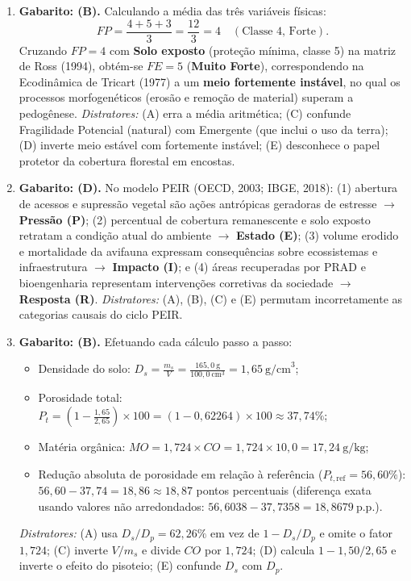\begin{boxGabarito}
\begin{enumerate}[leftmargin=1.8em, itemsep=5pt]
  \item \textbf{Gabarito: (B).} Calculando a média das três variáveis físicas:
  \[
    FP = \frac{4 + 5 + 3}{3} = \frac{12}{3} = 4 \quad (\text{Classe 4, Forte}).
  \]
  Cruzando $FP = 4$ com \textbf{Solo exposto} (proteção mínima, classe 5) na matriz de Ross (1994), obtém-se $FE = 5$ (\textbf{Muito Forte}), correspondendo na Ecodinâmica de Tricart (1977) a um \textbf{meio fortemente instável}, no qual os processos morfogenéticos (erosão e remoção de material) superam a pedogênese. \textit{Distratores:} (A) erra a média aritmética; (C) confunde Fragilidade Potencial (natural) com Emergente (que inclui o uso da terra); (D) inverte meio estável com fortemente instável; (E) desconhece o papel protetor da cobertura florestal em encostas.

  \item \textbf{Gabarito: (D).} No modelo PEIR (OECD, 2003; IBGE, 2018): (1) abertura de acessos e supressão vegetal são ações antrópicas geradoras de estresse $\to$ \textbf{Pressão (P)}; (2) percentual de cobertura remanescente e solo exposto retratam a condição atual do ambiente $\to$ \textbf{Estado (E)}; (3) volume erodido e mortalidade da avifauna expressam consequências sobre ecossistemas e infraestrutura $\to$ \textbf{Impacto (I)}; e (4) áreas recuperadas por PRAD e bioengenharia representam intervenções corretivas da sociedade $\to$ \textbf{Resposta (R)}. \textit{Distratores:} (A), (B), (C) e (E) permutam incorretamente as categorias causais do ciclo PEIR.

  \item \textbf{Gabarito: (B).} Efetuando cada cálculo passo a passo:
  \begin{itemize}[leftmargin=1.4em, itemsep=1pt, topsep=2pt]
    \item Densidade do solo: $D_s = \frac{m_s}{V} = \frac{165,0\ \text{g}}{100,0\ \text{cm}^3} = 1,65\ \text{g/cm}^3$;
    \item Porosidade total: $P_t = \left(1 - \frac{1,65}{2,65}\right)\times 100 = (1 - 0,62264)\times 100 \approx 37,74\%$;
    \item Matéria orgânica: $MO = 1,724 \times CO = 1,724 \times 10,0 = 17,24\ \text{g/kg}$;
    \item Redução absoluta de porosidade em relação à referência ($P_{t,\text{ref}} = 56,60\%$): $56,60 - 37,74 = 18,86 \approx 18,87$ pontos percentuais (diferença exata usando valores não arredondados: $56,6038 - 37,7358 = 18,8679\ \text{p.p.}$).
  \end{itemize}
  \textit{Distratores:} (A) usa $D_s/D_p = 62,26\%$ em vez de $1 - D_s/D_p$ e omite o fator $1,724$; (C) inverte $V/m_s$ e divide $CO$ por $1,724$; (D) calcula $1 - 1,50/2,65$ e inverte o efeito do pisoteio; (E) confunde $D_s$ com $D_p$.


\end{enumerate}
\end{boxGabarito}
